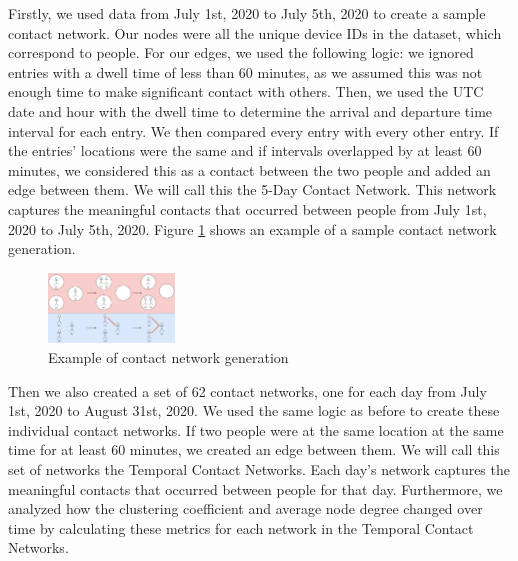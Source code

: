 \documentclass[times, 10pt,twocolumn]{article}
\begin{document}
Firstly, we used data from July 1st, 2020 to July 5th, 2020 to create a sample contact network. Our nodes were all the unique device IDs in the dataset, which correspond to people. For our edges, we used the following logic: we ignored entries with a dwell time of less than 60 minutes, as we assumed this was not enough time to make significant contact with others. Then, we used the UTC date and hour with the dwell time to determine the arrival and departure time interval for each entry. We then compared every entry with every other entry. If the entries' locations were the same and if intervals overlapped by at least 60 minutes, we considered this as a contact between the two people and added an edge between them. We will call this the 5-Day Contact Network. This network captures the meaningful contacts that occurred between people from July 1st, 2020 to July 5th, 2020. Figure \ref{fig:toy_label} shows an example of a sample contact network generation. 

\begin{figure}
    \centering
    \includegraphics[width=0.30\textwidth]{imgs/Network_Toy.png}
    \caption{Example of contact network generation}
    \label{fig:toy_label}
\end{figure}

Then we also created a set of 62 contact networks, one for each day from July 1st, 2020 to August 31st, 2020. We used the same logic as before to create these individual contact networks. If two people were at the same location at the same time for at least 60 minutes, we created an edge between them. We will call this set of networks the Temporal Contact Networks. Each day's network captures the meaningful contacts that occurred between people for that day. Furthermore, we analyzed how the clustering coefficient and average node degree changed over time by calculating these metrics for each network in the Temporal Contact Networks.
\end{document}
